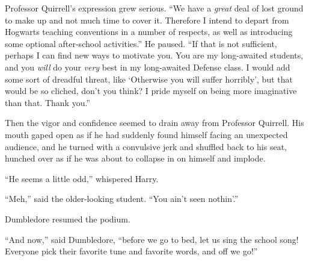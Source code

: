 Professor Quirrell’s expression grew serious. “We have a \emph{great} deal of lost ground to make up and not much time to cover it. Therefore I intend to depart from Hogwarts teaching conventions in a number of respects, as well as introducing some optional after-school activities.” He paused. “If that is not sufficient, perhaps I can find new ways to motivate you. You are my long-awaited students, and you \emph{will} do your \emph{very} best in my long-awaited Defense class. I would add some sort of dreadful threat, like ‘Otherwise you will suffer horribly’, but that would be so cliched, don’t you think? I pride myself on being more imaginative than that. Thank you.”

Then the vigor and confidence seemed to drain away from Professor Quirrell. His mouth gaped open as if he had suddenly found himself facing an unexpected audience, and he turned with a convulsive jerk and shuffled back to his seat, hunched over as if he was about to collapse in on himself and implode.

“He seems a little odd,” whispered Harry.

“Meh,” said the older-looking student. “You ain’t seen nothin’.”

Dumbledore resumed the podium.

“And now,” said Dumbledore, “before we go to bed, let us sing the school song! Everyone pick their favorite tune and favorite words, and off we go!”


